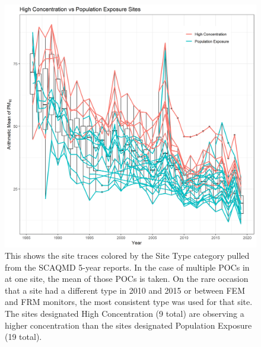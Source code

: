 \documentclass{article}
\begin{document}
\begin{figure}[ht]
    \centering
    \includegraphics[width = \textwidth]{Figures/SOCAB_metadata_Site_Type.png}
    \caption{This shows the site traces colored by the Site Type category pulled from the \ac{SCAQMD} 5-year reports.  In the case of multiple \ac{POC}s in at one site, the mean of those \ac{POC}s is taken.  On the rare occasion that a site had a different type in 2010 and 2015 or between \ac{FEM} and \ac{FRM} monitors, the most consistent type was used for that site.  The sites designated High Concentration (9 total) are observing a higher concentration than the sites designated Population Exposure (19 total).  }
    \label{fig:SOCAB_metadata_Site_Type}
\end{figure}
\end{document}
